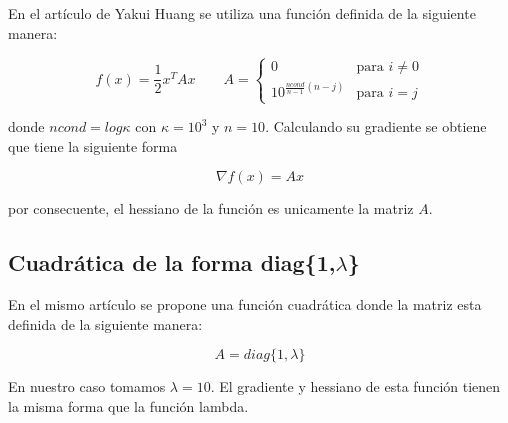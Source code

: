 En el artículo de Yakui Huang\cite{huang_2022_1} se utiliza una función definida de la siguiente manera:

\begin{equation*}
    f(x) = \frac{1}{2}x^TAx \qquad A=\begin{cases}
        0                           & \text{para } i\neq 0 \\
        10^{\frac{ncond}{n-1}(n-j)} & \text{para } i=j
    \end{cases}
\end{equation*}

donde $ncond=log \kappa$ con $\kappa = 10^3$ y $n=10$. Calculando su gradiente se obtiene que tiene la siguiente forma

\begin{equation*}
    \nabla f(x) = Ax
\end{equation*}

por consecuente, el hessiano de la función es unicamente la matriz $A$.

\subsection*{Cuadrática de la forma diag\{1,$\lambda$\}}

En el mismo artículo\cite{huang_2022_1} se propone una función cuadrática donde la matriz esta definida de la siguiente manera:

\begin{equation*}
    A = diag\{1,\lambda\}
\end{equation*}

En nuestro caso tomamos $\lambda=10$. El gradiente y hessiano de esta función tienen la misma forma que la función lambda.
